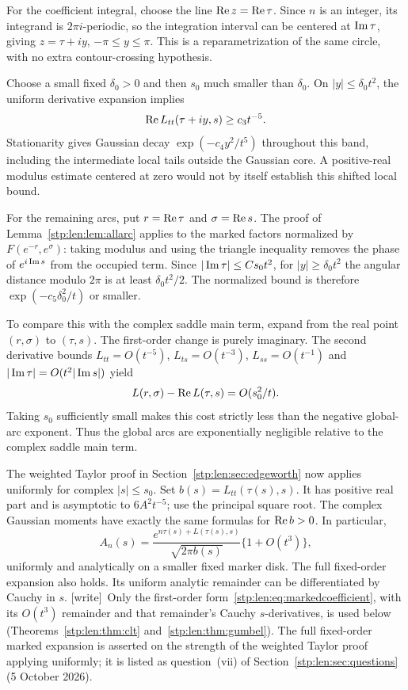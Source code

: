 \documentclass[11pt]{article}
\theoremstyle{remark}\newtheorem{remark}[theorem]{Remark}
\newcommand{\wtag}{\textup{[write]}}
\begin{document}
For the coefficient integral, choose the line $\operatorname{Re} z=\operatorname{Re}\tau$. Since $n$ is an integer, its integrand is $2\pi i$-periodic, so the integration interval can be centered at $\operatorname{Im}\tau$, giving $z=\tau+iy$, $-\pi\le y\le\pi$. This is a reparametrization of the same circle, with no extra contour-crossing hypothesis.

Choose a small fixed $\delta_0>0$ and then $s_0$ much smaller than $\delta_0$. On $|y|\le\delta_0t^2$, the uniform derivative expansion implies
\[
 \operatorname{Re} L_{tt}(\tau+iy,s)\ge c_3t^{-5}.
\]
Stationarity gives Gaussian decay $\exp(-c_4y^2/t^5)$ throughout this band, including the intermediate local tails outside the Gaussian core. A positive-real modulus estimate centered at zero would not by itself establish this shifted local bound.

For the remaining arcs, put $r=\operatorname{Re}\tau$ and $\sigma=\operatorname{Re} s$. The proof of Lemma~\ref{stp:len:lem:allarc} applies to the marked factors normalized by $F(e^{-r},e^\sigma)$: taking modulus and using the triangle inequality removes the phase of $e^{i\operatorname{Im} s}$ from the occupied term. Since $|\operatorname{Im}\tau|\le Cs_0t^2$, for $|y|\ge\delta_0t^2$ the angular distance modulo $2\pi$ is at least $\delta_0t^2/2$. The normalized bound is therefore $\exp(-c_5\delta_0^2/t)$ or smaller.

To compare this with the complex saddle main term, expand from the real point $(r,\sigma)$ to $(\tau,s)$. The first-order change is purely imaginary. The second derivative bounds $L_{tt}=O(t^{-5})$, $L_{ts}=O(t^{-3})$, $L_{ss}=O(t^{-1})$ and $|\operatorname{Im}\tau|=O(t^2|\operatorname{Im} s|)$ yield
\[
 L(r,\sigma)-\operatorname{Re} L(\tau,s)=O(s_0^2/t).
\]
Taking $s_0$ sufficiently small makes this cost strictly less than the negative global-arc exponent. Thus the global arcs are exponentially negligible relative to the complex saddle main term.

The weighted Taylor proof in Section~\ref{stp:len:sec:edgeworth} now applies uniformly for complex $|s|\le s_0$. Set
$b(s)=L_{tt}(\tau(s),s)$. It has positive real part and is asymptotic to $6A^2t^{-5}$; use the principal square root. The complex Gaussian moments have exactly the same formulas for $\operatorname{Re} b>0$. In particular,
\begin{equation}\label{stp:len:eq:markedcoefficient}
 A_n(s)=\frac{e^{n\tau(s)+L(\tau(s),s)}}{\sqrt{2\pi b(s)}}
 \{1+O(t^3)\},
\end{equation}
uniformly and analytically on a smaller fixed marker disk. The full fixed-order expansion also holds. Its uniform analytic remainder can be differentiated by Cauchy in $s$. \wtag\ Only the first-order form~\eqref{stp:len:eq:markedcoefficient}, with its
$O(t^3)$ remainder and that remainder's Cauchy $s$-derivatives, is used
below (Theorems~\ref{stp:len:thm:clt} and~\ref{stp:len:thm:gumbel}). The
full fixed-order marked expansion is asserted on the strength of the
weighted Taylor proof applying uniformly; it is listed as question~(vii) of
Section~\ref{stp:len:sec:questions} (5 October 2026).
\end{document}
